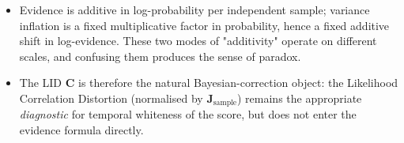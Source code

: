 \documentclass[11pt]{article}
\begin{document}
\begin{itemize}
\item Evidence is additive in log-probability per independent sample; variance inflation is a fixed multiplicative factor in probability, hence a fixed additive shift in log-evidence. These two modes of "additivity" operate on different scales, and confusing them produces the sense of paradox.
\item The LID $\mathbf C$ is therefore the natural Bayesian-correction object: the Likelihood Correlation Distortion (normalised by $\mathbf J_{\mathrm{sample}}$) remains the appropriate \emph{diagnostic} for temporal whiteness of the score, but does not enter the evidence formula directly.
\end{itemize}
\end{document}

